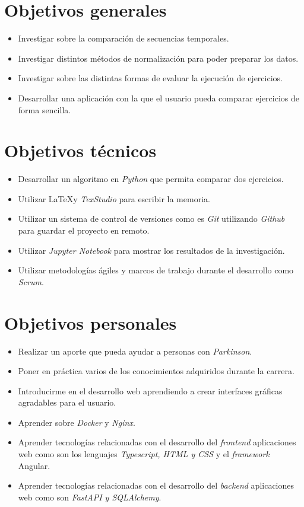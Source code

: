 
\section{Objetivos generales}
\begin{itemize}
	\item Investigar sobre la comparación de secuencias temporales.
	\item  Investigar distintos métodos de normalización para poder preparar los datos.
	\item Investigar sobre las distintas formas de evaluar la ejecución de ejercicios.
	\item Desarrollar una aplicación con la que el usuario pueda comparar ejercicios de forma sencilla.
\end{itemize}
\section{Objetivos técnicos}
\begin{itemize}
	\item Desarrollar un algoritmo en \textit{Python} que permita comparar dos ejercicios.
	\item Utilizar \LaTeX y \textit{TexStudio} para escribir la memoria.
	\item Utilizar un sistema de control de versiones como es \textit{Git} utilizando \textit{Github} para guardar el proyecto en remoto.
	\item Utilizar \textit{Jupyter Notebook} para mostrar los resultados de la investigación.
	\item Utilizar metodologías ágiles y marcos de trabajo durante el desarrollo como \textit{Scrum}. 
	
\end{itemize}
\section{Objetivos personales}
\begin{itemize}
	\item Realizar un aporte que pueda ayudar a personas con \textit{Parkinson}.
	\item Poner en práctica varios de los conocimientos adquiridos durante la carrera.
	 \item Introducirme en el desarrollo web aprendiendo a crear interfaces gráficas agradables para el usuario.
	\item Aprender sobre \textit{Docker} y \textit{Nginx}.
	\item Aprender tecnologías relacionadas con el desarrollo del \textit{frontend} aplicaciones web como son los lenguajes \textit{Typescript, HTML y CSS} y el \textit{framework} Angular. 
	\item Aprender tecnologías relacionadas con el desarrollo del \textit{backend} aplicaciones web como son \textit{FastAPI y SQLAlchemy}.
\end{itemize}